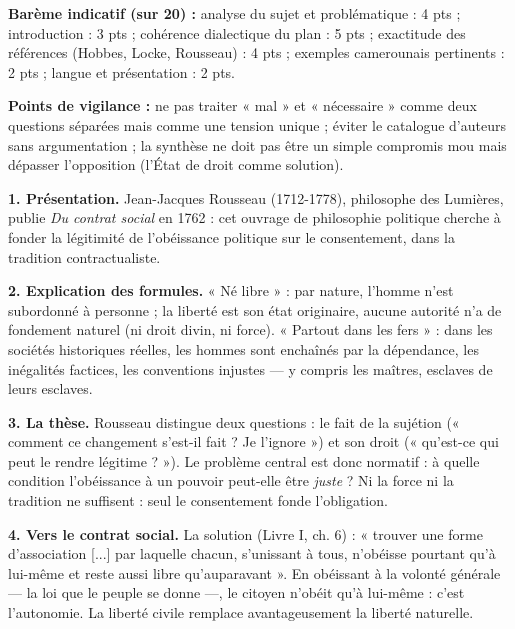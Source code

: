 \documentclass[11pt]{article}
\newcommand{\cle}[1]{{\popxbold\color{popdark}#1}}
\begin{document}
\begin{corrige}
\textbf{Barème indicatif (sur 20) :} analyse du sujet et problématique : 4 pts ; introduction : 3 pts ; cohérence dialectique du plan : 5 pts ; exactitude des références (Hobbes, Locke, Rousseau) : 4 pts ; exemples camerounais pertinents : 2 pts ; langue et présentation : 2 pts.

\textbf{Points de vigilance :} ne pas traiter « mal » et « nécessaire » comme deux questions séparées mais comme une tension unique ; éviter le catalogue d'auteurs sans argumentation ; la synthèse ne doit pas être un simple compromis mou mais dépasser l'opposition (l'État de droit comme solution).

\end{corrige}

\begin{corrige}

\textbf{1. Présentation.} Jean-Jacques Rousseau (1712-1778), philosophe des Lumières, publie \emph{Du contrat social} en 1762 : cet ouvrage de philosophie politique cherche à fonder la légitimité de l'obéissance politique sur le consentement, dans la tradition contractualiste.

\textbf{2. Explication des formules.} « Né libre » : par nature, l'homme n'est subordonné à personne ; la liberté est son état originaire, aucune autorité n'a de fondement naturel (ni droit divin, ni force). « Partout dans les fers » : dans les sociétés historiques réelles, les hommes sont enchaînés par la dépendance, les inégalités factices, les conventions injustes — y compris les maîtres, esclaves de leurs esclaves.

\textbf{3. La thèse.} Rousseau distingue deux questions : le fait de la sujétion (« comment ce changement s'est-il fait ? Je l'ignore ») et son droit (« qu'est-ce qui peut le rendre légitime ? »). Le problème central est donc normatif : à quelle condition l'obéissance à un pouvoir peut-elle être \emph{juste} ? Ni la force ni la tradition ne suffisent : seul le consentement fonde l'obligation.

\textbf{4. Vers le contrat social.} La solution (Livre I, ch. 6) : « trouver une forme d'association [...] par laquelle chacun, s'unissant à tous, n'obéisse pourtant qu'à lui-même et reste aussi libre qu'auparavant ». En obéissant à la \cle{volonté générale} — la loi que le peuple se donne —, le citoyen n'obéit qu'à lui-même : c'est l'\cle{autonomie}. La liberté civile remplace avantageusement la liberté naturelle.


\end{corrige}
\end{document}
